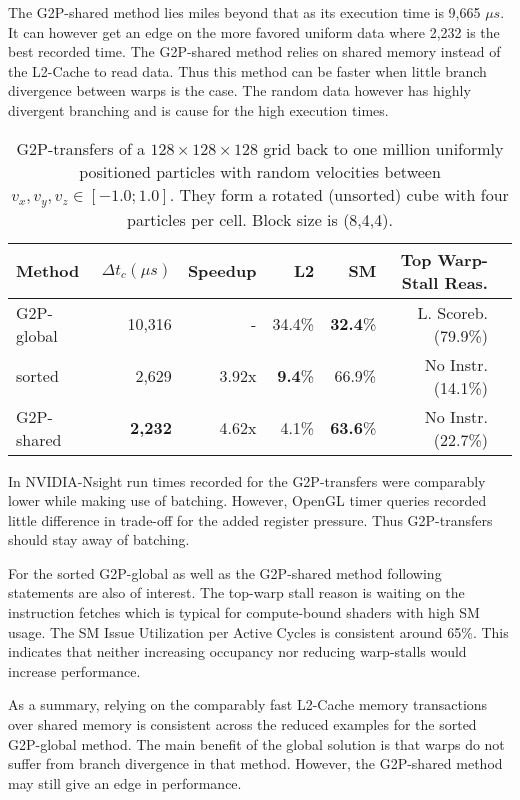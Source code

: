 \documentclass[m,times]{cgMA}
\begin{document}
The G2P-shared method lies miles beyond that as its execution time is 9,665 $\mu s$. It can however get an edge on the more favored uniform data where 2,232 is the best recorded time. The G2P-shared method relies on shared memory instead of the L2-Cache to read data. Thus this method can be faster when little branch divergence between warps is the case. The random data however has highly divergent branching and is cause for the high execution times.

\begin{table}[htpb]
  \begin{tabular}{ | l | r | r | r | r | r | r |}    \hline
    Method                 &  $\Delta t_c(\mu s)$ &Speedup         & L2   &SM             & Top Warp-Stall Reas.\\\hline
    G2P-global             &   10,316             &-               &34.4\%&\textbf{32.4}\%         & L. Scoreb.(79.9\%) \\\hline
    sorted                 &    2,629		  &3.92x           &\textbf{9.4}\%&66.9\%          & No Instr.(14.1\%) \\\hline
    G2P-shared             &    \textbf{2,232}             &4.62x           &4.1\% &\textbf{63.6}\%& No Instr.(22.7\%) \\\hline
 \end{tabular}
 \caption{G2P-transfers of a $128\times 128\times128$ grid back to one million uniformly positioned particles with random velocities between $v_x,v_y,v_z \in [-1.0;1.0]$. They form a rotated (unsorted) cube with four particles per cell. Block size is (8,4,4).}\label{table:g2p_uniform4}
\end{table}

In NVIDIA-Nsight run times recorded for the G2P-transfers were comparably lower while making use of batching. However, OpenGL timer queries recorded little difference in trade-off for the added register pressure. Thus G2P-transfers should stay away of batching.

For the sorted G2P-global as well as the G2P-shared method following statements are also of interest. The top-warp stall reason is waiting on the instruction fetches which is typical for compute-bound shaders with high SM usage. The SM Issue Utilization per Active Cycles is consistent around 65\%. This indicates that neither increasing occupancy nor reducing warp-stalls would increase performance.

As a summary, relying on the comparably fast L2-Cache memory transactions over shared memory is consistent across the reduced examples for the sorted G2P-global method. The main benefit of the global solution is that warps do not suffer from branch divergence in that method. However, the G2P-shared method may still give an edge in performance.
\end{document}
